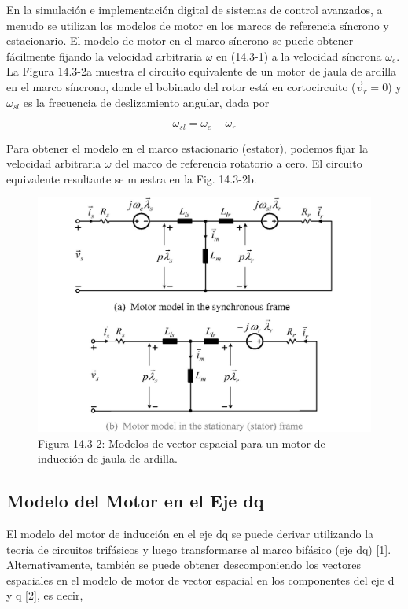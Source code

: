 \documentclass[letterpaper,12pt]{article}
\begin{document}
En la simulación e implementación digital de sistemas de control avanzados, a menudo se utilizan los modelos de motor en los marcos de referencia síncrono y estacionario. El modelo de motor en el marco síncrono se puede obtener fácilmente fijando la velocidad arbitraria $\omega$ en (14.3-1) a la velocidad síncrona $\omega_e$. La Figura 14.3-2a muestra el circuito equivalente de un motor de jaula de ardilla en el marco síncrono, donde el bobinado del rotor está en cortocircuito ($\vec{v}_r = 0$) y $\omega_{sl}$ es la frecuencia de deslizamiento angular, dada por

\begin{equation}
\omega_{sl} = \omega_e - \omega_r \tag{14.3-4}
\end{equation}

Para obtener el modelo en el marco estacionario (estator), podemos fijar la velocidad arbitraria $\omega$ del marco de referencia rotatorio a cero. El circuito equivalente resultante se muestra en la Fig. 14.3-2b.

\begin{figure}[ht]
\centering
\includegraphics{graficos/img04.jpg}
\caption{Figura 14.3-2: Modelos de vector espacial para un motor de inducción de jaula de ardilla.}
\end{figure}
\FloatBarrier

\subsection{Modelo del Motor en el Eje dq}

El modelo del motor de inducción en el eje dq se puede derivar utilizando la teoría de circuitos trifásicos y luego transformarse al marco bifásico (eje dq) [1]. Alternativamente, también se puede obtener descomponiendo los vectores espaciales en el modelo de motor de vector espacial en los componentes del eje d y q [2], es decir,
\end{document}
